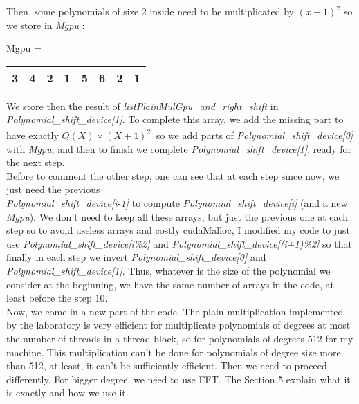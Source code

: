 Then, some polynomials of size 2 inside need to be multiplicated by $(x+1)^2$ so we store in \textit{Mgpu} :\\
\begin{center}
Mgpu = \begin{tabular}{|c|c||c|c||c|c||c|c|}
\hline
3 & 4 & 2 & 1 & 5 & 6 & 2 & 1 \\
\hline
\end{tabular}
\end{center}


We store then the result of \textit{listPlainMulGpu\_and\_right\_shift} in \textit{Polynomial\_shift\_device[1]}. To complete this array, we add the missing part to have exactly $Q(X) \times (X+1)^{2^i}$ so we add parts of \textit{Polynomial\_shift\_device[0]} with \textit{Mgpu}, and then to finish we complete \textit{Polynomial\_shift\_device[1]}, ready for the next step.\\

Before to comment the other step, one can see that at each step since now, we just need the previous\\ \textit{Polynomial\_shift\_device[i-1]} to compute \textit{Polynomial\_shift\_device[i]} (and a new \textit{Mgpu}). We don't need to keep all these arrays, but just the previous one at each step so to avoid useless arrays and costly cudaMalloc, I modified my code to just use \textit{Polynomial\_shift\_device[i\%2]} and \textit{Polynomial\_shift\_device[(i+1)\%2]} so that finally in each step we invert \textit{Polynomial\_shift\_device[0]} and \textit{Polynomial\_shift\_device[1]}. Thus, whatever is the size of the polynomial we consider at the beginning, we have the same number of arrays in the code, at least before the step $10$.\\

Now, we come in a new part of the code. The plain multiplication implemented by the laboratory is very efficient for multiplicate polynomials of degrees at most the number of threads in a thread block, so for polynomials of degrees 512 for my machine. This multiplication can't be done for polynomials of degree size more than 512, at least, it can't be sufficiently efficient. Then we need to proceed differently. For bigger degree, we need to use FFT. The Section 5 explain what it is exactly and how we use it.

